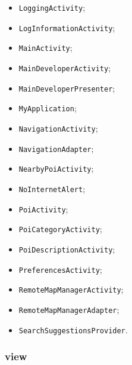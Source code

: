 \documentclass[../DefinizioneDiProdotto.tex]{subfiles}
\begin{document}
\begin{itemize}
\begin{itemize}
		\item \texttt{LoggingActivity};
		
		\item \texttt{LogInformationActivity};
		
		\item \texttt{MainActivity};
		
		\item \texttt{MainDeveloperActivity};
		
		\item \texttt{MainDeveloperPresenter};
		
		\item \texttt{MyApplication};
		
		\item \texttt{NavigationActivity};
		
		\item \texttt{NavigationAdapter};
		
		\item \texttt{NearbyPoiActivity};
		
		\item \texttt{NoInternetAlert};
		
		\item \texttt{PoiActivity};
		
		\item \texttt{PoiCategoryActivity};
		
		\item \texttt{PoiDescriptionActivity};
		
		\item \texttt{PreferencesActivity};
		
		\item \texttt{RemoteMapManagerActivity};
		
		\item \texttt{RemoteMapManagerAdapter};
		
		\item \texttt{SearchSuggestionsProvider}.
		
	\end{itemize}
\end{itemize}

\subsubsection{view}
\end{document}
